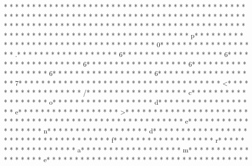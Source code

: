 * * *  * * *  * * *  *  * * *  *  * * *  *  * * *  * * *  * * *  *  * * *  *  * * *  *  * * *  * * *  * * *  *  * * *  *  * * *  *  * * *  * * *  * * *  *  * * *  *  * * *  *  * * *  * * *  * * *  *  * * *  *  * * *  *  * * *  * * *  * * *  *  * * *  *  * * *  *  * * *  * * *  * * *  *  * * *  *  * * *  *  * * *  * * *  * * *  *  * * *  *  * * *  *  * * *  * * *  * * *  *  * * *  *  * * *  * p* * *  * * *  * * *  *  * * *  *  * * *  * 
* * *  * * *  * * *  *  * * *  *  * * *  * 0* * *  * * *  * * *  *  * * *  *  * * *  * .* * *  * * *  * * *  *  * * *  *  * * *  * 6* * *  * * *  * * *  *  * * *  *  * * *  * 6* * *  * * *  * * *  *  * * *  *  * * *  * 6* * *  * * *  * * *  *  * * *  *  * * *  * 6* * *  * * *  * * *  *  * * *  *  * * *  * 6* * *  * * *  * * *  *  * * *  *  * * *  * 6* * *  * * *  * * *  *  * * *  *  * * *  * 7* * *  * * *  * * *  *  * * *  *  * * *  * 
* * *  * * *  * * *  *  * * *  *  * * *  * <* * *  * * *  * * *  *  * * *  *  * * *  * /* * *  * * *  * * *  *  * * *  *  * * *  * c* * *  * * *  * * *  *  * * *  *  * * *  * o* * *  * * *  * * *  *  * * *  *  * * *  * d* * *  * * *  * * *  *  * * *  *  * * *  * e* * *  * * *  * * *  *  * * *  *  * * *  * >* * *  * * *  * * *  *  * * *  *  * * *  * 
* * *  * * *  * * *  *  * * *  *  * * *  * 
* * *  * * *  * * *  *  * * *  *  * * *  * e* * *  * * *  * * *  *  * * *  *  * * *  * n* * *  * * *  * * *  *  * * *  *  * * *  * d* * *  * * *  * * *  *  * * *  *  * * *  * {* * *  * * *  * * *  *  * * *  *  * * *  * f* * *  * * *  * * *  *  * * *  *  * * *  * r* * *  * * *  * * *  *  * * *  *  * * *  * a* * *  * * *  * * *  *  * * *  *  * * *  * m* * *  * * *  * * *  *  * * *  *  * * *  * e* * *  * * *  * * *  *  * * *  *  * * *  * }* * *  * * *  * * *  *  * * *  *  * * *  * 

